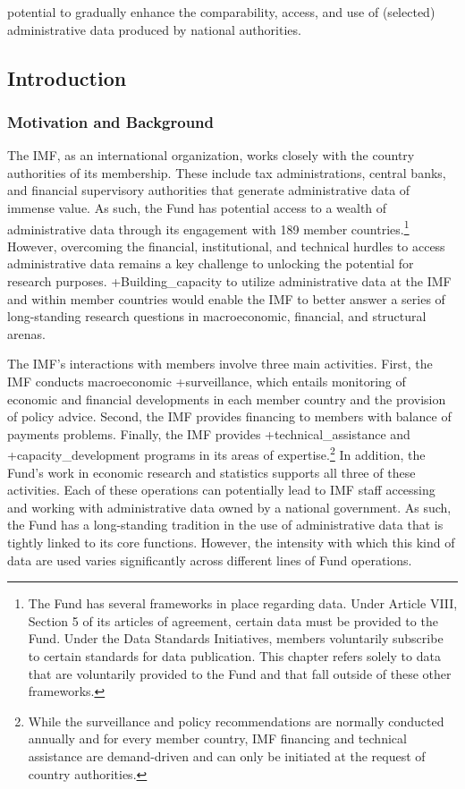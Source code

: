 \documentclass[
]{WileySix}
\begin{document}
potential to gradually enhance the comparability, access, and use of (selected) administrative data produced by national authorities.

\hypertarget{introduction-9}{%
\subsection{Introduction}\label{introduction-9}}

\hypertarget{motivation-and-background-8}{%
\subsubsection{Motivation and Background}\label{motivation-and-background-8}}

The IMF, as an international organization, works closely with the country authorities of its membership. These include tax administrations, central banks, and financial supervisory authorities that generate administrative data of immense value. As such, the Fund has potential access to a wealth of administrative data through its engagement with 189 member countries.\footnote{The Fund has several frameworks in place regarding data. Under Article VIII, Section 5 of its articles of agreement, certain data must be provided to the Fund. Under the Data Standards Initiatives, members voluntarily subscribe to certain standards for data publication. This chapter refers solely to data that are voluntarily provided to the Fund and that fall outside of these other frameworks.} However, overcoming the financial, institutional, and technical hurdles to access administrative data remains a key challenge to unlocking the potential for research purposes. +Building\_capacity\textbar{} to utilize administrative data at the IMF and within member countries would enable the IMF to better answer a series of long-standing research questions in macroeconomic, financial, and structural arenas.

The IMF's interactions with members involve three main activities. First, the IMF conducts macroeconomic +surveillance\textbar, which entails monitoring of economic and financial developments in each member country and the provision of policy advice. Second, the IMF provides financing to members with balance of payments problems. Finally, the IMF provides +technical\_assistance\textbar{} and +capacity\_development\textbar{} programs in its areas of expertise.\footnote{While the surveillance and policy recommendations are normally conducted annually and for every member country, IMF financing and technical assistance are demand-driven and can only be initiated at the request of country authorities.} In addition, the Fund's work in economic research and statistics supports all three of these activities. Each of these operations can potentially lead to IMF staff accessing and working with administrative data owned by a national government. As such, the Fund has a long-standing tradition in the use of administrative data that is tightly linked to its core functions. However, the intensity with which this kind of data are used varies significantly across different lines of Fund operations.
\end{document}
